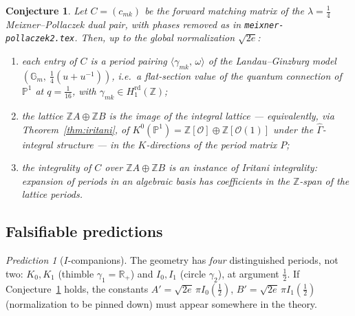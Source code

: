 \documentclass[11pt]{article}
\newtheorem{conjecture}[proposition]{Conjecture}
\theoremstyle{definition}
\theoremstyle{remark}
\newtheorem{prediction}[proposition]{Prediction}
\newcommand{\R}{\mathbb{R}}
\newcommand{\Z}{\mathbb{Z}}
\newcommand{\Gm}{\mathbb{G}_m}
\newcommand{\PP}{\mathbb{P}}
\newcommand{\rd}{\mathrm{rd}}
\newcommand{\G}{\Gamma}
\begin{document}
\begin{conjecture}\label{conj:main}
Let $C = (c_{mk})$ be the forward matching matrix of the
$\lambda = \tfrac14$ Meixner--Pollaczek dual pair, with phases
removed as in \texttt{meixner-pollaczek2.tex}. Then, up to the
global normalization $\sqrt{2e}$:
\begin{enumerate}
\item[(i)] each entry of $C$ is a period pairing
$\langle \gamma_{mk},\, \omega \rangle$ of the Landau--Ginzburg
model $(\Gm,\ \tfrac14(u + u^{-1}))$, i.e.\ a flat-section value of
the quantum connection of $\PP^1$ at $q = \tfrac1{16}$, with
$\gamma_{mk} \in H_1^{\rd}(\Z)$;
\item[(ii)] the lattice $\Z A \oplus \Z B$ is the image of the
integral lattice --- equivalently, via Theorem~\ref{thm:iritani},
of $K^0(\PP^1) = \Z[\mathcal O]\oplus\Z[\mathcal O(1)]$ under the
$\widehat\G$-integral structure --- in the $K$-directions of the
period matrix $P$;
\item[(iii)] the integrality of $C$ over $\Z A \oplus \Z B$ is an
instance of Iritani integrality: expansion of periods in an
algebraic basis has coefficients in the $\Z$-span of the lattice
periods.
\end{enumerate}
\end{conjecture}

\subsection{Falsifiable predictions}

\begin{prediction}[$I$-companions]\label{pred:I}
The geometry has \emph{four} distinguished periods, not two:
$K_0, K_1$ (thimble $\gamma_1 = \R_+$) and $I_0, I_1$ (circle
$\gamma_2$), at argument $\tfrac12$. If
Conjecture~\ref{conj:main} holds, the constants
$A' = \sqrt{2e}\,\pi I_0(\tfrac12)$,
$B' = \sqrt{2e}\,\pi I_1(\tfrac12)$ (normalization to be pinned
down) must appear somewhere in the theory.
\end{prediction}
\end{document}
